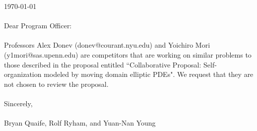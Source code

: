 \documentclass[11pt]{article}
\begin{document}
\sloppy

\noindent
\today \\ \\
Dear Program Officer:
\\ \\
Professors Alex Donev (donev@courant.nyu.edu) and Yoichiro Mori
(y1mori@sas.upenn.edu) are competitors that are working on similar
problems to those described in the proposal entitled ``Collaborative
Proposal: Self-organization modeled by moving domain elliptic PDEs". We
request that they are not chosen to review the proposal.
\\ \\
Sincerely, \\ \\
Bryan Quaife, Rolf Ryham, and Yuan-Nan Young
\end{document}

